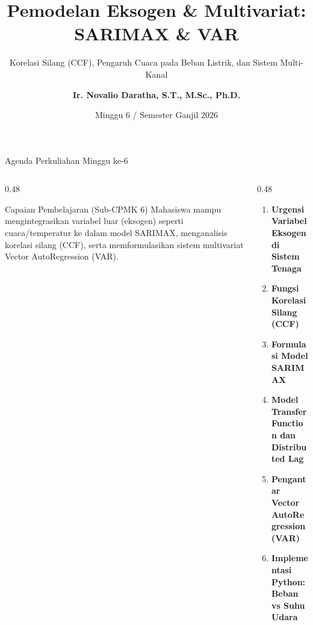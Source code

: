\documentclass[aspectratio=169, 10pt]{beamer}
\title[\textbf{Deret Waktu (Minggu 6)}]{\textbf{Pemodelan Eksogen \& Multivariat: SARIMAX \& VAR}}
\subtitle{Korelasi Silang (CCF), Pengaruh Cuaca pada Beban Listrik, dan Sistem Multi-Kanal}
\author[\textbf{Ir. Novalio Daratha, Ph.D.}]{\textbf{Ir. Novalio Daratha, S.T., M.Sc., Ph.D.}}
\institute[FT UNIB]{Program Studi Teknik Elektro -- Fakultas Teknik\\Universitas Bengkulu}
\date{Minggu 6 / Semester Ganjil 2026}
\begin{document}
\begin{frame}[plain]
    \titlepage
\end{frame}

\begin{frame}{Agenda Perkuliahan Minggu ke-6}
    \begin{columns}[T]
        \begin{column}{0.48\textwidth}
            \begin{block}{Capaian Pembelajaran (Sub-CPMK 6)}
                Mahasiswa mampu mengintegrasikan variabel luar (eksogen) seperti cuaca/temperatur ke dalam model SARIMAX, menganalisis korelasi silang (CCF), serta memformulasikan sistem multivariat Vector AutoRegression (VAR).
            \end{block}
        \end{column}
        \begin{column}{0.48\textwidth}
            \begin{enumerate}
                \item \textbf{Urgensi Variabel Eksogen di Sistem Tenaga}
                \item \textbf{Fungsi Korelasi Silang (CCF)}
                \item \textbf{Formulasi Model SARIMAX}
                \item \textbf{Model Transfer Function dan Distributed Lag}
                \item \textbf{Pengantar Vector AutoRegression (VAR)}
                \item \textbf{Implementasi Python: Beban vs Suhu Udara}
            \end{enumerate}
        \end{column}
    \end{columns}
\end{frame}
\end{document}
